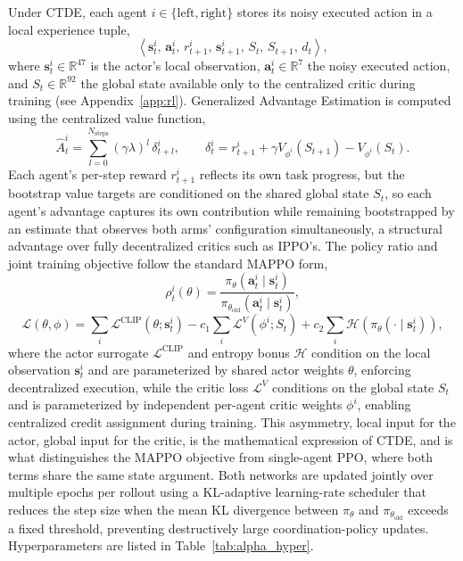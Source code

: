Under CTDE, each agent $i \in \{\text{left}, \text{right}\}$ stores its noisy executed action in a
local experience tuple,
\begin{equation}
\left\langle \mathbf{s}_t^i,\, \mathbf{a}_t^i,\, r_{t+1}^i,\, \mathbf{s}_{t+1}^i,\, S_t,\, S_{t+1},\, d_t \right\rangle,
\label{eq:alpha_rollout}
\end{equation}
where $\mathbf{s}_t^i \in \mathbb{R}^{47}$ is the actor's local observation, $\mathbf{a}_t^i \in
\mathbb{R}^7$ the noisy executed action, and $S_t \in \mathbb{R}^{92}$ the global state available
only to the centralized critic during training (see Appendix~\ref{app:rl}). Generalized Advantage Estimation is computed using
the centralized value function,
\begin{equation}
\hat{A}_t^i = \sum_{l=0}^{N_{\text{steps}}} (\gamma\lambda)^l\, \delta_{t+l}^i, \qquad
\delta_t^i = r_{t+1}^i + \gamma V_{\phi^i}(S_{t+1}) - V_{\phi^i}(S_t).
\label{eq:alpha_gae}
\end{equation}
Each agent's per-step reward $r_{t+1}^i$ reflects its own task progress, but the bootstrap value
targets are conditioned on the shared global state $S_t$, so each agent's advantage captures its
own contribution while remaining bootstrapped by an estimate that observes both arms' configuration
simultaneously, a structural advantage over fully decentralized critics such as IPPO's. The policy
ratio and joint training objective follow the standard MAPPO form,
\begin{equation}
\rho_t^i(\theta) = \frac{\pi_\theta(\mathbf{a}_t^i \mid \mathbf{s}_t^i)}{\pi_{\theta_{\text{old}}}(\mathbf{a}_t^i \mid \mathbf{s}_t^i)},
\label{eq:alpha_ratio}
\end{equation}
\begin{equation}
\mathcal{L}(\theta, \phi) = \sum_{i} \mathcal{L}^{\text{CLIP}}(\theta; \mathbf{s}_t^i)
- c_1 \sum_i \mathcal{L}^V(\phi^i; S_t) + c_2 \sum_i \mathcal{H}\!\left( \pi_\theta(\cdot \mid \mathbf{s}_t^i) \right),
\label{eq:alpha_totalloss}
\end{equation}
where the actor surrogate $\mathcal{L}^{\text{CLIP}}$ and entropy bonus $\mathcal{H}$ condition on
the local observation $\mathbf{s}_t^i$ and are parameterized by shared actor weights $\theta$,
enforcing decentralized execution, while the critic loss $\mathcal{L}^V$ conditions on the global
state $S_t$ and is parameterized by independent per-agent critic weights $\phi^i$, enabling
centralized credit assignment during training. This asymmetry, local input for the actor, global
input for the critic, is the mathematical expression of CTDE, and is what distinguishes the MAPPO
objective from single-agent PPO, where both terms share the same state argument. Both networks are
updated jointly over multiple epochs per rollout using a KL-adaptive learning-rate scheduler that
reduces the step size when the mean KL divergence between $\pi_\theta$ and $\pi_{\theta_{\text{old}}}$
exceeds a fixed threshold, preventing destructively large coordination-policy updates.
Hyperparameters are listed in Table~\ref{tab:alpha_hyper}.

